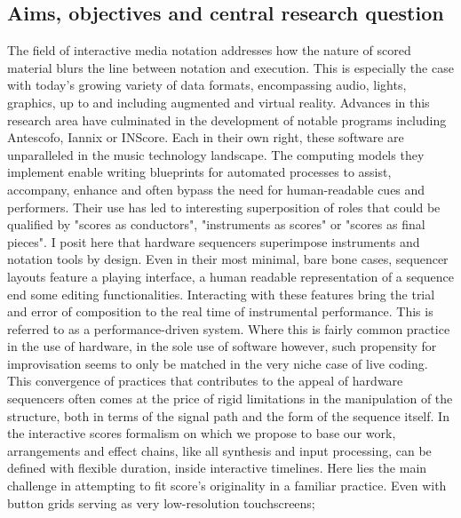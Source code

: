 \documentclass[journal,onecolumn]{IEEEtran}
\begin{document}
\subsection{Aims, objectives and central research question}
The field of interactive media notation addresses how the nature of scored material blurs the line between notation and execution. This is especially the case with today's growing variety of data formats, encompassing audio, lights, graphics, up to and including augmented and virtual reality. 
Advances in this research area have culminated in the development of notable programs including Antescofo\cite{ircam:antescofo}, Iannix\cite{buzzing:iannix} or INScore\cite{grame:inscore}.
Each in their own right, these software are unparalleled in the music technology landscape. The computing models they implement enable writing blueprints for automated processes to assist, accompany, enhance and often bypass the need for human-readable cues and performers. Their use has led to interesting superposition of roles that could be qualified by "scores as conductors", "instruments as scores" or "scores as final pieces". I posit here that hardware sequencers superimpose instruments and notation tools by design. Even in their most minimal, bare bone cases, sequencer layouts feature a playing interface, a human readable representation of a sequence end some editing functionalities.
Interacting with these features bring the trial and error of composition to the real time of instrumental performance. This is referred to as a performance-driven system\cite{nash:liveness}. Where this is fairly common practice in the use of hardware, in the sole use of software however, such propensity for improvisation seems to only be matched in the very niche case of live coding\cite{blackwell:livecoding}.
This convergence of practices that contributes to the appeal of hardware sequencers often comes at the price of rigid limitations in the manipulation of the structure, both in terms of the signal path and the form of the sequence itself.
In the interactive scores formalism on which we propose to base our work, arrangements and effect chains, like all synthesis and input processing, can be defined with flexible duration, inside interactive timelines. Here lies the main challenge in attempting to fit score's originality in a familiar practice. Even with button grids serving as very low-resolution touchscreens;
\end{document}

